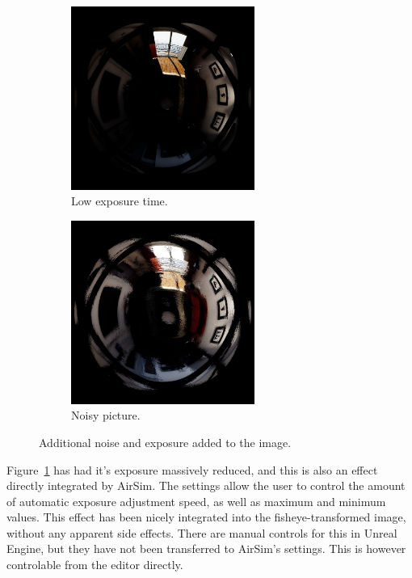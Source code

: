 \begin{figure}[!htb]
    \centering
    \begin{subfigure}{0.45\textwidth}
        \centering
        \includegraphics[height=6cm]{rapport/fig/Results/pp/no_nooise_high_min_brightness.jpeg}
        \caption{Low exposure time.}
        \label{fig:res_pp_exposure_yes}
    \end{subfigure}
    \begin{subfigure}{0.45\textwidth}
        \centering
        \includegraphics[height=6cm]{rapport/fig/Results/pp/noise_normal_exposure.jpeg}
        \caption{Noisy picture.}
        \label{fig:res_pp_noise_yes}
    \end{subfigure}
    \caption{Additional noise and exposure added to the image.}
    \label{fig:res_pp}
\end{figure}

Figure~\ref{fig:res_pp_exposure_yes} has had it's exposure massively reduced, and this is also an effect directly integrated by AirSim. The settings allow the user to control the amount of automatic exposure adjustment speed, as well as maximum and minimum values. This effect has been nicely integrated into the fisheye-transformed image, without any apparent side effects. There are manual controls for this in Unreal Engine, but they have not been transferred to AirSim's settings. This is however controlable from the editor directly.

